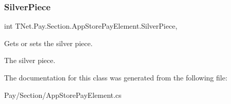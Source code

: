 \subsubsection{\texorpdfstring{Silver\+Piece}{SilverPiece}}
{\footnotesize\ttfamily int T\+Net.\+Pay.\+Section.\+App\+Store\+Pay\+Element.\+Silver\+Piece\hspace{0.3cm}{\ttfamily [get]}, {\ttfamily [set]}}



Gets or sets the silver piece. 

The silver piece.

The documentation for this class was generated from the following file\+:\begin{DoxyCompactItemize}
\item 
Pay/\+Section/App\+Store\+Pay\+Element.\+cs\end{DoxyCompactItemize}
